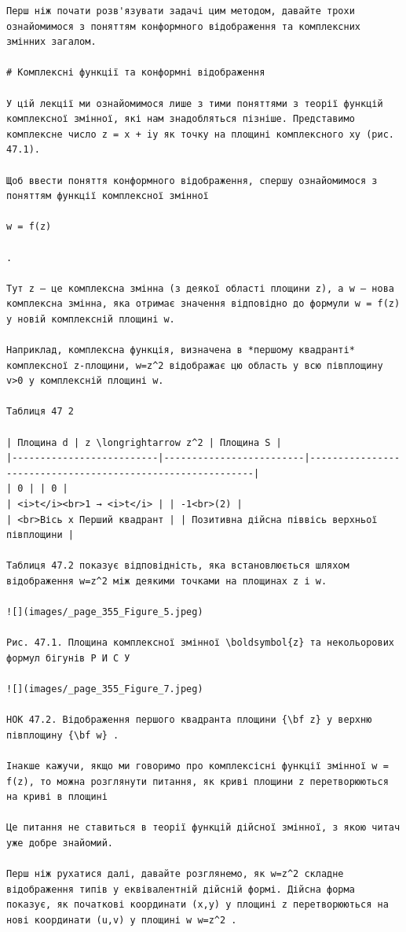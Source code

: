 \documentclass[
  ukrainian,
]{article}
\begin{document}
\begin{verbatim}
Перш ніж почати розв'язувати задачі цим методом, давайте трохи ознайомимося з поняттям конформного відображення та комплексних змінних загалом.

# Комплексні функції та конформні відображення

У цій лекції ми ознайомимося лише з тими поняттями з теорії функцій комплексної змінної, які нам знадобляться пізніше. Представимо комплексне число z = x + iy як точку на площині комплексного xy (рис. 47.1).

Щоб ввести поняття конформного відображення, спершу ознайомимося з поняттям функції комплексної змінної

w = f(z)

.

Тут z — це комплексна змінна (з деякої області площини z), а w — нова комплексна змінна, яка отримає значення відповідно до формули w = f(z) у новій комплексній площині w.

Наприклад, комплексна функція, визначена в *першому квадранті* комплексної z-площини, w=z^2 відображає цю область у всю півплощину v>0 у комплексній площині w.

Таблиця 47 2

| Площина d | z \longrightarrow z^2 | Площина S |
|--------------------------|-------------------------|------------------------------------------------------------|
| 0 | | 0 |
| <i>t</i><br>1 → <i>t</i> | | -1<br>(2) |
| <br>Вісь x Перший квадрант | | Позитивна дійсна піввісь верхньої півплощини |

Таблиця 47.2 показує відповідність, яка встановлюється шляхом відображення w=z^2 між деякими точками на площинах z і w.

![](images/_page_355_Figure_5.jpeg)

Рис. 47.1. Площина комплексної змінної \boldsymbol{z} та некольорових формул бігунів Р И С У

![](images/_page_355_Figure_7.jpeg)

НОК 47.2. Відображення першого квадранта площини {\bf z} у верхню півплощину {\bf w} .

Інакше кажучи, якщо ми говоримо про комплексісні функції змінної w = f(z), то можна розглянути питання, як криві площини z перетворюються на криві в площині

Це питання не ставиться в теорії функцій дійсної змінної, з якою читач уже добре знайомий.

Перш ніж рухатися далі, давайте розглянемо, як w=z^2 складне відображення типів у еквівалентній дійсній формі. Дійсна форма показує, як початкові координати (x,y) у площині z перетворюються на нові координати (u,v) у площині w w=z^2 .


\end{verbatim}
\end{document}
